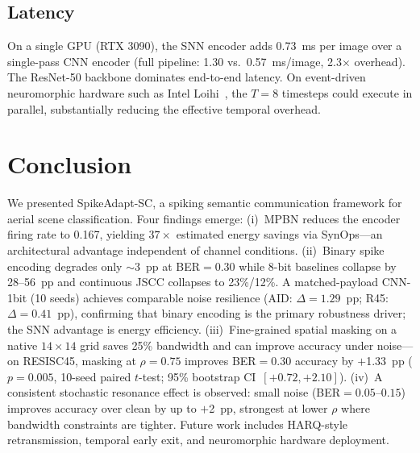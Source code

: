 \documentclass[conference]{IEEEtran}
\begin{document}
\subsection{Latency}

On a single GPU (RTX 3090), the SNN encoder adds 0.73~ms per image over a single-pass CNN encoder (full pipeline: 1.30 vs.\ 0.57~ms/image, 2.3$\times$ overhead). The ResNet-50 backbone dominates end-to-end latency. On event-driven neuromorphic hardware such as Intel Loihi~\cite{davies2018loihi}, the $T{=}8$ timesteps could execute in parallel, substantially reducing the effective temporal overhead.

\section{Conclusion}
\label{sec:conclusion}

We presented SpikeAdapt-SC, a spiking semantic communication framework for aerial scene classification. Four findings emerge: (i)~MPBN reduces the encoder firing rate to 0.167, yielding $37{\times}$ estimated energy savings via SynOps---an architectural advantage independent of channel conditions. (ii)~Binary spike encoding degrades only $\sim$3~pp at BER$=0.30$ while 8-bit baselines collapse by 28--56~pp and continuous JSCC collapses to 23\%/12\%. A matched-payload CNN-1bit (10 seeds) achieves comparable noise resilience (AID: $\Delta{=}1.29$~pp; R45: $\Delta{=}0.41$~pp), confirming that binary encoding is the primary robustness driver; the SNN advantage is energy efficiency. (iii)~Fine-grained spatial masking on a native $14{\times}14$ grid saves 25\% bandwidth and can improve accuracy under noise---on RESISC45, masking at $\rho{=}0.75$ improves BER$=0.30$ accuracy by $+$1.33~pp ($p{=}0.005$, 10-seed paired $t$-test; 95\% bootstrap CI~$[+0.72, +2.10]$). (iv)~A consistent stochastic resonance effect is observed: small noise (BER$=0.05$--$0.15$) improves accuracy over clean by up to $+$2~pp, strongest at lower $\rho$ where bandwidth constraints are tighter. Future work includes HARQ-style retransmission, temporal early exit, and neuromorphic hardware deployment.


\end{document}
